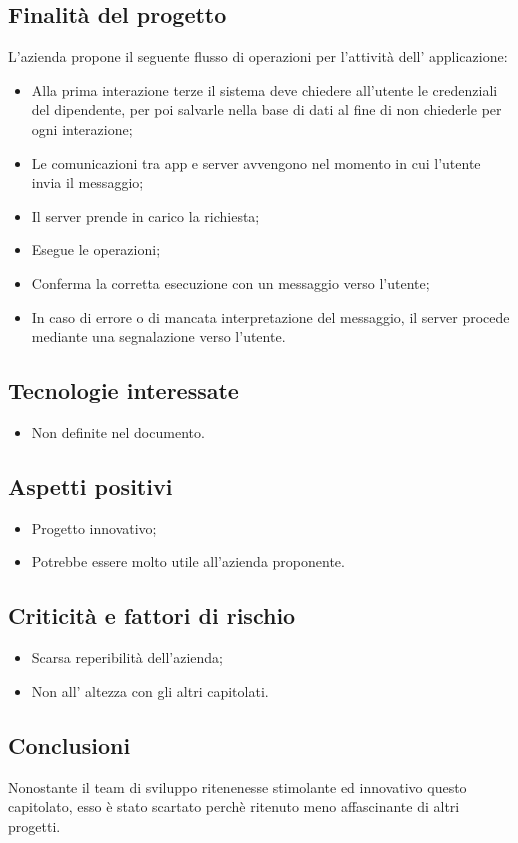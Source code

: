 	\subsection{Finalità del progetto}
		L'azienda propone il seguente flusso di operazioni per l'attività dell' applicazione:
	\begin {itemize}
    \item Alla prima interazione terze il sistema deve chiedere all’utente le credenziali del dipendente, per poi salvarle nella base di dati al fine di non chiederle per ogni interazione;
    \item Le comunicazioni tra app e server avvengono nel momento in cui l'utente invia il messaggio;
    \item Il server prende in carico la richiesta;
    \item Esegue le operazioni;
    \item Conferma la corretta esecuzione con un messaggio verso l'utente;
    \item In caso di errore o di mancata interpretazione del messaggio, il server procede mediante una segnalazione verso l'utente.
	\end {itemize}

	\subsection {Tecnologie interessate}
		\begin {itemize}
			\item Non definite nel documento.
		\end {itemize}

	\subsection{Aspetti positivi}
		\begin{itemize}
			\item Progetto innovativo;
			\item Potrebbe essere molto utile all'azienda proponente.
		\end{itemize}
	\subsection {Criticità e fattori di rischio}
		\begin{itemize}
			\item Scarsa reperibilità dell'azienda;
			\item Non all' altezza con gli altri capitolati.
	\end{itemize}
\subsection {Conclusioni}
Nonostante il team di sviluppo ritenenesse stimolante ed innovativo questo capitolato, esso è stato scartato perchè ritenuto meno affascinante di altri progetti.